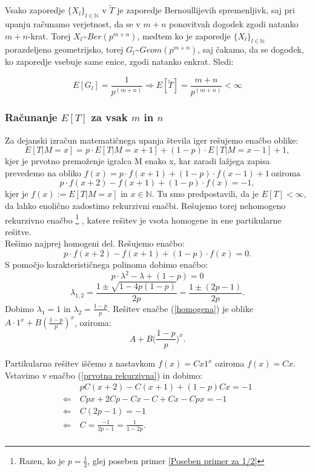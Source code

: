 \documentclass[12pt, a4paper]{article}
\begin{document}
Vsako zaporedje $\{X_l\}_{l \in \mathbb{N}}$ v $\widetilde{T}$ je zaporedje Bernoullijevih spremenljivk, saj pri upanju računamo verjetnost, da se v $m+n$ ponovitvah dogodek zgodi natanko $m+n$-krat. Torej $X_l$\textasciitilde $Ber(p^{m+n})$, medtem ko je zaporedje 
$\{X_l\}_{l \in \mathbb{N}}$ porazdeljeno geometrijsko, torej $G_l$\textasciitilde $Geom(p^{m+n})$, saj čakamo, da se dogodek, ko zaporedje vsebuje same enice, zgodi natanko enkrat. Sledi:

$$E[G_l]=\frac{1}{p^{(m+n)}} \Longrightarrow E[\widetilde{T}] = \frac{m+n}{p^{(m+n)}} < \infty$$

\newpage
\subsubsection{Računanje $E[T]$ za vsak $m$ in $n$}
Za dejanski izračun matematičnega upanja števila iger rešujemo enačbo oblike: $$E[T|M=x] = p\cdot E[T|M=x+1] + (1-p)\cdot E[T|M=x-1] + 1,$$ kjer je prvotno premoženje igralca M enako x, kar zaradi lažjega zapisa prevedemo na obliko $f(x) = p\cdot f(x+1) + (1-p) \cdot f(x-1) + 1 ~ \textrm{oziroma} $ 
\begin{equation}
\label{prvotna rekurzivna}
p\cdot f(x+2) - f(x+1) + (1-p)\cdot f(x) = -1,
\end{equation}
kjer je $f(x):=E[T|M=x]$ in $x \in \mathbb{N}$. Tu smo predpostavili, da je $E[T] < \infty$, da lahko enolično zadostimo rekurzivni enačbi. 
Rešujemo torej nehomogeno rekurzivno enačbo \footnote{Razen, ko je $p=\frac{1}{2}$, glej poseben primer \ref{Poseben primer za 1/2} } , katere rešitev je vsota homogene in ene partikularne rešitve. \\

Rešimo najprej homogeni del. Rešujemo enačbo: 
\begin{equation}
\label{homogena}
p\cdot f(x+2) - f(x+1) + (1-p)\cdot f(x) = 0.
\end{equation}
S pomočjo karakterističnega polinoma dobimo enačbo: $$p\cdot  \lambda ^2 - \lambda + (1-p) = 0$$ $$\lambda _{1, 2}= \frac{1 \pm \sqrt{1 - 4p(1-p)}}{2p} = \frac{1 \pm (2p-1)}{2p}.$$
Dobimo $\lambda _{1} = 1$ in $\lambda _{2} = \frac{1-p}{p}$. Rešitev enačbe (\ref{homogena}) je oblike $A\cdot 1^x + B(\frac{1-p}{p})^x$, oziroma: $$A+ B \bigg( \frac{1-p}{p} \bigg )^x. $$

Partikularno rešitev iščemo z nastavkom $f(x)= Cx1^x$ oziroma $f(x)= Cx$. Vstavimo v enačbo (\ref{prvotna rekurzivna}) in dobimo: 
\begin{equation*}
\begin{split}
 &~pC(x+2)-C(x+1)+(1-p)Cx=-1\\
\Leftarrow & ~Cpx+2Cp-Cx-C+Cx-Cpx=-1 \\
\Leftarrow & ~C(2p-1)=-1\\
\Leftarrow & ~C=\frac{-1}{2p-1} = \frac{1}{1-2p}.\\
\end{split}
\end{equation*}
 
\end{document}
